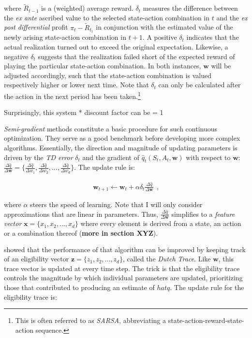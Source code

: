 where $\widetilde{R}_{t-1}$ is a (weighted) average reward. $\delta_t$ measures the difference between the \emph{ex ante} ascribed value to the selected state-action combination in $t$ and the \emph{ex post} \emph{differential} profit $\pi_t - \widetilde{R}_{t_1}$ in conjunction with the estimated value of the newly arising state-action combination in $t+1$. A positive $\delta_t$ indicates that the actual realization turned out to exceed the original expectation. Likewise, a negative $\delta_t$ suggests that the realization failed short of the expected reward of playing the particular state-action combination. In both instances, $\boldsymbol{w}$ will be adjusted accordingly, such that the state-action combination is valued respectively higher or lower next time. Note that $\delta_t$ can only be calculated after the action in the next period has been taken.\footnote{This is often referred to as \emph{SARSA}, abbreviating a state-action-reward-state-action sequence.}


Surprisingly, this system 
* discount factor can be = 1






\emph{Semi-gradient} methods constitute a basic procedure for such continuous optimization. They serve as a good benchmark before developing more complex algorithms. Essentially, the direction and magnitude of updating parameters is driven by the \emph{TD error} $\delta_t$ and the gradient of $\hat{q}_t(S_t, A_t, \boldsymbol{w})$ with respect to $\boldsymbol{w}$:
$\frac{\Delta \hat{q}}{\Delta \boldsymbol{w}} =
\{ \frac{\Delta \hat{q}}{\Delta w_1},
\frac{\Delta \hat{q}}{\Delta w_2},
...,
\frac{\Delta \hat{q}}{\Delta w_d}  \}$. The update rule is:

\begin{gather}
 \boldsymbol{w}_{t+1} \leftarrow \boldsymbol{w}_t +
 	\alpha \delta_t
 	\frac{\Delta \hat{q}}{\Delta \boldsymbol{w}} ~~ \text{,}
\end{gather}

where $\alpha$ steers the speed of learning. Note that I will only consider approximations that are linear in parameters. Thus, $\frac{\Delta \hat{q}}{\Delta \boldsymbol{w}}$ simplifies to a \emph{feature vector} $\boldsymbol{x} = \{x_1, x_2, ..., x_d\}$ where every element is derived from a state, an action or a combination thereof (\textbf{more in section XYZ}).

\textcite{seijen_true_2014} showed that the performance of that algorithm can be improved by keeping track of an eligibility vector $\boldsymbol{z} = \{z_1, z_2, ..., z_d\}$, called the \emph{Dutch Trace}. Like $\boldsymbol{w}$, this trace vector is updated at every time step. The trick is that the eligibility trace controls the magnitude by which individual parameters are updated, prioritizing those that contributed to producing an estimate of $hat{q}$. The update rule for the eligibility trace is:

